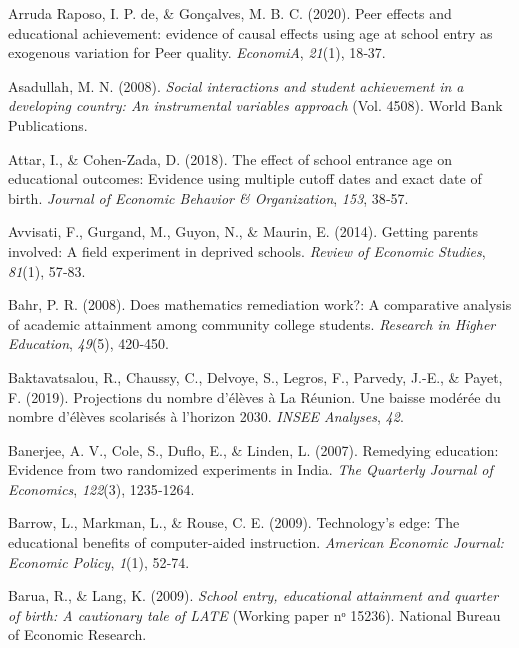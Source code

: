 \documentclass[
]{book}
\newlength{\cslhangindent}
\newlength{\cslentryspacingunit} %
\newenvironment{CSLReferences}[2] %
 {%
  \setlength{\parindent}{0pt}
  \ifodd #1
  \let\oldpar\par
  \def\par{\hangindent=\cslhangindent\oldpar}
  \fi
  \setlength{\parskip}{#2\cslentryspacingunit}
 }%
 {}
\begin{document}
\begin{CSLReferences}{1}{2}
\leavevmode{}%
Arruda Raposo, I. P. de, \& Gonçalves, M. B. C. (2020). Peer effects and educational achievement: evidence of causal effects using age at school entry as exogenous variation for Peer quality. \emph{EconomiA}, \emph{21}(1), 18‑37.

\leavevmode{}%
Asadullah, M. N. (2008). \emph{Social interactions and student achievement in a developing country: An instrumental variables approach} (Vol. 4508). World Bank Publications.

\leavevmode{}%
Attar, I., \& Cohen-Zada, D. (2018). The effect of school entrance age on educational outcomes: Evidence using multiple cutoff dates and exact date of birth. \emph{Journal of Economic Behavior \& Organization}, \emph{153}, 38‑57.

\leavevmode{}%
Avvisati, F., Gurgand, M., Guyon, N., \& Maurin, E. (2014). Getting parents involved: A field experiment in deprived schools. \emph{Review of Economic Studies}, \emph{81}(1), 57‑83.

\leavevmode{}%
Bahr, P. R. (2008). Does mathematics remediation work?: A comparative analysis of academic attainment among community college students. \emph{Research in Higher Education}, \emph{49}(5), 420‑450.

\leavevmode{}%
Baktavatsalou, R., Chaussy, C., Delvoye, S., Legros, F., Parvedy, J.-E., \& Payet, F. (2019). Projections du nombre d'élèves à La Réunion. Une baisse modérée du nombre d'élèves scolarisés à l'horizon 2030. \emph{INSEE Analyses}, \emph{42}.

\leavevmode{}%
Banerjee, A. V., Cole, S., Duflo, E., \& Linden, L. (2007). Remedying education: Evidence from two randomized experiments in India. \emph{The Quarterly Journal of Economics}, \emph{122}(3), 1235‑1264.

\leavevmode{}%
Barrow, L., Markman, L., \& Rouse, C. E. (2009). Technology's edge: The educational benefits of computer-aided instruction. \emph{American Economic Journal: Economic Policy}, \emph{1}(1), 52‑74.

\leavevmode{}%
Barua, R., \& Lang, K. (2009). \emph{School entry, educational attainment and quarter of birth: A cautionary tale of LATE} (Working paper nᵒ 15236). National Bureau of Economic Research.


\end{CSLReferences}
\end{document}
